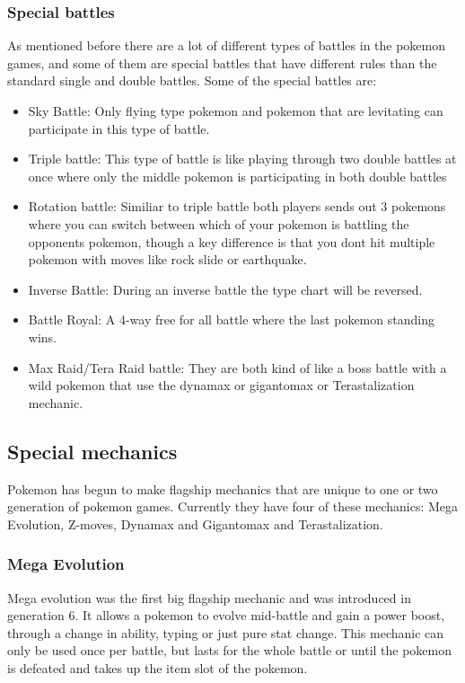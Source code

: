 \subsubsection{Special battles}
As mentioned before there are a lot of different types of battles in the pokemon games, and some of them are special battles that have different rules
than the standard single and double battles. Some of the special battles are: \cite{PokemonBattles}
\begin{itemize}
  \item Sky Battle: Only flying type pokemon and pokemon that are levitating can participate in this type of battle.
  \item Triple battle: This type of battle is like playing through two double battles at once where only the middle pokemon is participating 
    in both double battles
  \item Rotation battle: Similiar to triple battle both players sends out 3 pokemons where you can switch between which of your pokemon is battling
    the opponents pokemon, though a key difference is that you dont hit multiple pokemon with moves like rock slide or earthquake. 
  \item Inverse Battle: During an inverse battle the type chart will be reversed.
  \item Battle Royal: A 4-way free for all battle where the last pokemon standing wins.
  \item Max Raid/Tera Raid battle: They are both kind of like a boss battle with a wild pokemon that use the 
  dynamax or gigantomax or Terastalization mechanic.
\end{itemize}

\subsection{Special mechanics}
Pokemon has begun to make flagship mechanics that are unique to one or two generation of pokemon games.
Currently they have four of these mechanics: Mega Evolution, Z-moves, Dynamax and Gigantomax and Terastalization.
\subsubsection{Mega Evolution}
Mega evolution was the first big flagship mechanic and was introduced in generation 6. It allows a pokemon to evolve mid-battle and gain a 
power boost, through a change in ability, typing or just pure stat change. This mechanic can only be used once per battle, but lasts for the whole battle
or until the pokemon is defeated and takes up the item slot of the pokemon.\cite{MegaEvolution}
